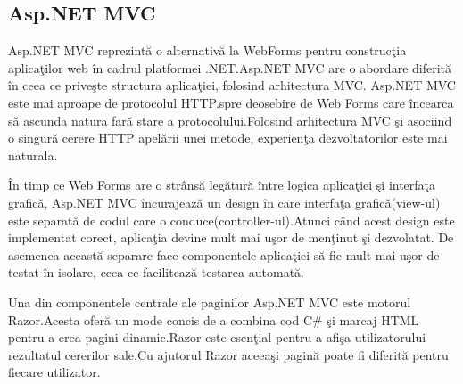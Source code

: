 \documentclass[a4paper,12pt]{report}
\begin{document}
\subsection{Asp.NET MVC}
Asp.NET MVC reprezint\u a o alternativ\u a la WebForms pentru construc\c tia aplica\c tilor web \^in cadrul
platformei .NET.Asp.NET MVC are o abordare diferit\u a \^in ceea ce prive\c ste structura aplica\c tiei, folosind
arhitectura MVC.
Asp.NET MVC este mai aproape de protocolul HTTP.spre deosebire de Web Forms care \^incearca s\u a ascunda 
natura far\u a stare a protocolului.Folosind arhitectura MVC \c si asociind o singur\u a cerere HTTP apel\u arii 
unei metode, experien\c ta dezvoltatorilor este mai naturala.

\^In timp ce Web Forms are o str\^ans\u a leg\u atur\u a \^intre logica aplica\c tiei \c si interfa\c ta grafic\u a,
Asp.NET MVC \^incurajeaz\u a un design \^in care interfa\c ta grafic\u a(view-ul) este separat\u a de codul
care o conduce(controller-ul).Atunci c\^and acest design este implementat corect, aplica\c tia devine mult mai u\c sor de men\c tinut
\c si dezvolatat.
De asemenea aceast\u a separare face componentele aplica\c tiei s\u a fie mult mai u\c sor de testat \^in isolare,
ceea ce faciliteaz\u a testarea automat\u a.

Una din componentele centrale ale paginilor Asp.NET MVC este motorul Razor.Acesta ofer\u a un mode concis
de a combina cod C\# \c si marcaj HTML pentru a crea pagini dinamic.Razor este esen\c tial pentru a afi\c sa 
utilizatorului rezultatul cererilor sale.Cu ajutorul Razor aceea\c si pagin\u a poate fi diferit\u a pentru 
fiecare utilizator.
\end{document}
